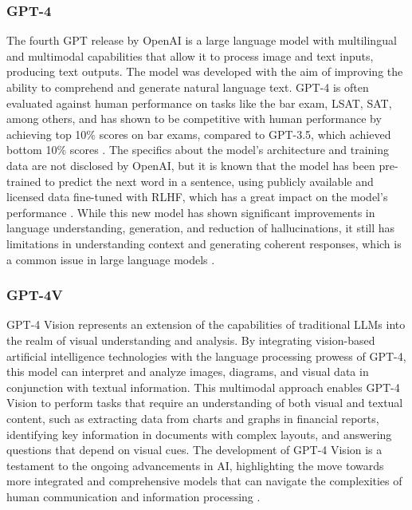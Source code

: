 \documentclass[english, 12pt, a4paper, elec, utf8, a-2b, online]{aaltothesis}
\begin{document}
\subsubsection{GPT-4}

The fourth \ac{GPT} release by OpenAI is a large language model with multilingual and multimodal capabilities that allow it to process image and text inputs, producing text outputs.
The model was developed with the aim of improving the ability to comprehend and generate natural language text.
\ac{GPT}-4 is often evaluated against human performance on tasks like the bar exam, LSAT, SAT, among others, and has shown to be competitive with human performance by achieving top 10\% scores on bar exams, compared to \ac{GPT}-3.5, which achieved bottom 10\% scores \cite{OpenAI2023GPT4}.
The specifics about the model's architecture and training data are not disclosed by OpenAI, but it is known that the model has been pre-trained to predict the next word in a sentence, using publicly available and licensed data fine-tuned with \ac{RLHF}, which has a great impact on the model's performance \cite{OpenAI2023GPT4}.
While this new model has shown significant improvements in language understanding, generation, and reduction of hallucinations, it still has limitations in understanding context and generating coherent responses, which is a common issue in large language models \cite{OpenAI2023GPT4}.

\subsubsection{GPT-4V}

GPT-4 Vision represents an extension of the capabilities of traditional \ac{LLM}s into the realm of visual understanding and analysis.
By integrating vision-based artificial intelligence technologies with the language processing prowess of GPT-4, this model can interpret and analyze images, diagrams, and visual data in conjunction with textual information.
This multimodal approach enables GPT-4 Vision to perform tasks that require an understanding of both visual and textual content, such as extracting data from charts and graphs in financial reports, identifying key information in documents with complex layouts, and answering questions that depend on visual cues.
The development of GPT-4 Vision is a testament to the ongoing advancements in \ac{AI}, highlighting the move towards more integrated and comprehensive models that can navigate the complexities of human communication and information processing \cite{2023GPT4VisionSC}.
\end{document}
